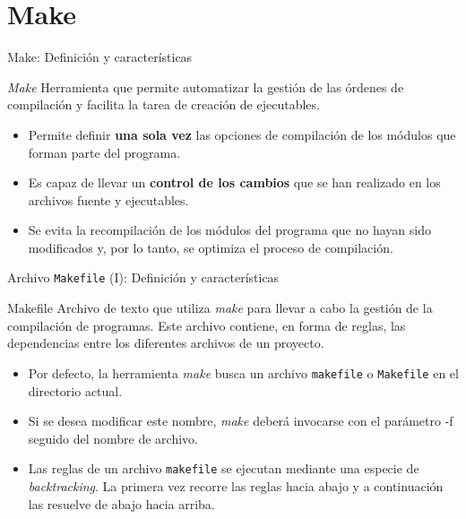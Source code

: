 \documentclass{beamer}
\begin{document}
\section{Make}
	\begin{frame}{Make: Definición y características}
		\begin{block}{\textit{Make}}		
			\justifying Herramienta que permite automatizar la gestión de las órdenes de compilación y facilita la tarea de creación de ejecutables.		
		\end{block}		
		
		\begin{itemize}		
			\vfill\item \justifying Permite definir \textbf{una sola vez} las opciones de compilación de los módulos que forman parte del programa. \\
			\vfill\item \justifying Es capaz de llevar un \textbf{control de los cambios} que se han realizado en los archivos fuente y ejecutables.
			\vfill\item \justifying Se evita la recompilación de los módulos del programa que no hayan sido modificados y, por lo tanto, se optimiza el proceso de compilación.
		\end{itemize}
	\end{frame}
	
	\begin{frame}{Archivo \texttt{Makefile} (I): Definición y características}
		\begin{block}{Makefile}		
			\justifying Archivo de texto que utiliza \textit{make} para llevar a cabo la gestión de la compilación de programas. Este archivo contiene, en forma de reglas, las dependencias entre los diferentes archivos de un proyecto.	
		\end{block}		
		
		\begin{itemize}		
			\vfill\item \justifying Por defecto, la herramienta \textit{make} busca un archivo \texttt{makefile} o \texttt{Makefile} en el directorio actual. 
			\vfill\item \justifying Si se desea modificar este nombre, \textit{make} deberá invocarse con el parámetro -f seguido del nombre de archivo. \\
			\vfill\item \justifying Las reglas de un archivo \texttt{makefile} se ejecutan mediante una especie de \textit{backtracking}. La primera vez recorre las reglas hacia abajo y a continuación las resuelve de abajo hacia arriba.
		\end{itemize}
	\end{frame}	
	
\end{document}
